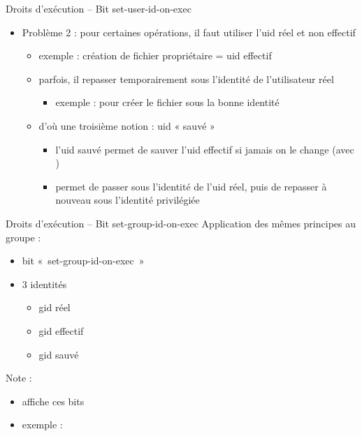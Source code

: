 \begin {frame} {Droits d'exécution -- Bit set-user-id-on-exec}
    \begin {itemize}
	\item Problème 2 : pour certaines opérations, il faut utiliser
	    l'uid réel et non effectif
	    \begin {itemize}
		\item exemple : création de fichier
		    \implique propriétaire = uid effectif
		\item parfois, il repasser temporairement sous l'identité
		    de l'utilisateur réel
		    \begin {itemize} 
			\item exemple : pour créer le fichier sous la bonne identité
		    \end {itemize}

		\item d'où une troisième notion : uid « sauvé »
		    \begin {itemize}
			\item l'uid sauvé permet de sauver l'uid effectif
			    si jamais on le change (avec
			    )
			\item permet de passer sous l'identité de
			    l'uid réel, puis de repasser à nouveau
			    sous l'identité privilégiée
		    \end {itemize}
	    \end {itemize}
    \end {itemize}
\end {frame}

\begin {frame} {Droits d'exécution -- Bit set-group-id-on-exec}
    Application des mêmes principes au groupe :

    \begin {itemize}
	\item bit «~set-group-id-on-exec~»
	\item 3 identités
	    \begin {itemize}
		\item gid réel
		\item gid effectif
		\item gid sauvé
	    \end {itemize}
    \end {itemize}

    \vspace* {5mm}
    Note :

    \begin {itemize}
	\item {} affiche ces bits
	\item exemple :

	    \vspace* {1mm}

	    {\fD
	     \\
	     \\
	    }

    \end {itemize}
\end {frame}

